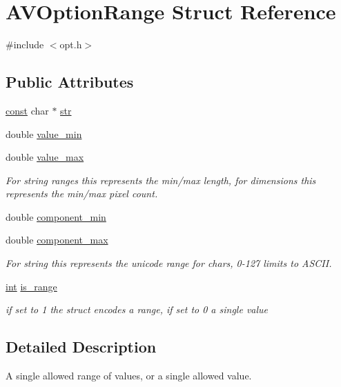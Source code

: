 \hypertarget{struct_a_v_option_range}{}\section{A\+V\+Option\+Range Struct Reference}
\label{struct_a_v_option_range}


{\ttfamily \#include $<$opt.\+h$>$}

\subsection*{Public Attributes}
\begin{DoxyCompactItemize}
\item 
\hyperlink{getopt1_8c_a2c212835823e3c54a8ab6d95c652660e}{const} char $\ast$ \hyperlink{struct_a_v_option_range_a354f95a62affe330479bb9941146d734}{str}
\item 
double \hyperlink{struct_a_v_option_range_adb21ecde2d4e6b47b9107816f9287ccb}{value\+\_\+min}
\item 
double \hyperlink{struct_a_v_option_range_aa2876b63377f218ec0faa3482c467086}{value\+\_\+max}
\begin{DoxyCompactList}\small\item\em For string ranges this represents the min/max length, for dimensions this represents the min/max pixel count. \end{DoxyCompactList}\item 
double \hyperlink{struct_a_v_option_range_a2f107bb96630be02d4aec9657b24bb3a}{component\+\_\+min}
\item 
double \hyperlink{struct_a_v_option_range_a120c4beda04930e2e9a51237d99c96c9}{component\+\_\+max}
\begin{DoxyCompactList}\small\item\em For string this represents the unicode range for chars, 0-\/127 limits to A\+S\+C\+II. \end{DoxyCompactList}\item 
\hyperlink{xmltok_8h_a5a0d4a5641ce434f1d23533f2b2e6653}{int} \hyperlink{struct_a_v_option_range_afb2f043056ff5fea103f24ba98eafafc}{is\+\_\+range}
\begin{DoxyCompactList}\small\item\em if set to 1 the struct encodes a range, if set to 0 a single value \end{DoxyCompactList}\end{DoxyCompactItemize}


\subsection{Detailed Description}
A single allowed range of values, or a single allowed value. 

